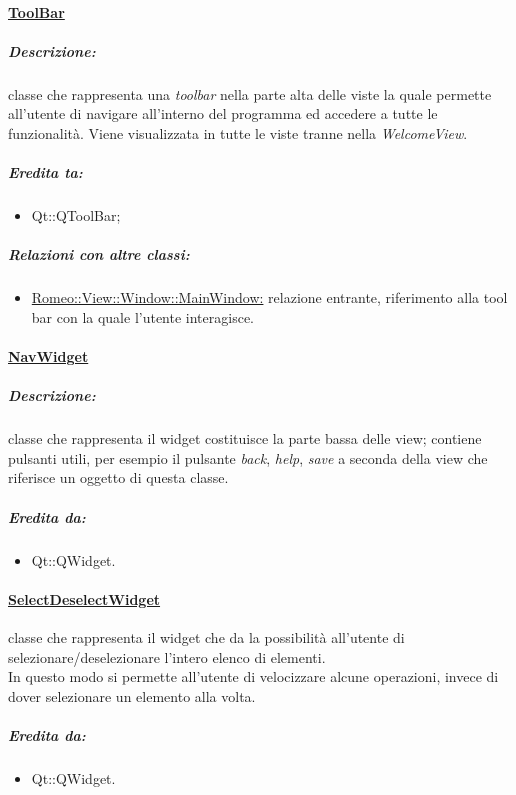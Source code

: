 		\paragraph{\underline{ToolBar}}
		\label{tb}
			\subparagraph{Descrizione:} classe che rappresenta una \textit{toolbar} nella parte alta delle viste la quale permette all'utente di navigare all'interno del programma ed accedere a tutte le funzionalità.
			Viene visualizzata in tutte le viste tranne nella \textit{WelcomeView}.
			\subparagraph{Eredita ta:}
				\begin{itemize}
					\item Qt::QToolBar;
				\end{itemize}
			\subparagraph{Relazioni con altre classi:}
				\begin{itemize}
					\item \hyperref[mainview]{Romeo::View::Window::MainWindow:} relazione entrante, riferimento alla tool bar con la quale l'utente interagisce.
				\end{itemize}
			
		\paragraph{\underline{NavWidget}}
		\label{nav} 
			\subparagraph{Descrizione:} classe che rappresenta il widget costituisce la parte bassa delle view; contiene pulsanti utili, per esempio il  pulsante \emph{back}, \emph{help}, \emph{save} a seconda della view che riferisce un oggetto di questa classe.
			
			\subparagraph{Eredita da:}
				\begin{itemize}
				\item Qt::QWidget.
				\end{itemize}
	
	\paragraph{\underline{SelectDeselectWidget}}
		\label{selDel} classe che rappresenta il widget che da la possibilità all'utente di selezionare/deselezionare l'intero elenco di elementi.
		\\In questo modo si permette all'utente di velocizzare alcune operazioni, invece di dover selezionare un elemento alla volta.
		\subparagraph{Eredita da:}
			\begin{itemize}
			\item Qt::QWidget.
			\end{itemize}
			
